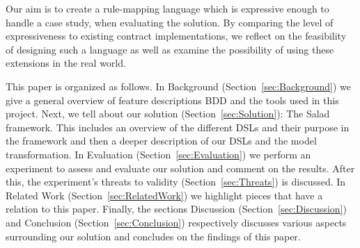 Our aim is to create a rule-mapping language which is expressive enough to handle a case study, when evaluating the solution.
By comparing the level of expressiveness to existing contract implementations, 
we reflect on the feasibility of designing such a language as well as examine the possibility of using these extensions in the real world.

This paper is organized as follows.
In Background (Section~\ref{sec:Background}) we give a general overview of feature descriptions BDD and the tools used in this project. 
Next, we tell about our solution (Section~\ref{sec:Solution}): The Salad framework.
This includes an overview of the different DSLs and their purpose in the framework and then a deeper description of our DSLs and the model transformation.
In Evaluation (Section~\ref{sec:Evaluation}) we perform an experiment to assess and evaluate our solution and comment on the results.
After this, the experiment's threats to validity (Section~\ref{sec:Threats}) is discussed.
In Related Work (Section~\ref{sec:RelatedWork}) we highlight pieces that have a relation to this paper.
Finally, the sections Discussion (Section~\ref{sec:Discussion}) and Conclusion (Section~\ref{sec:Conclusion}) respectively discusses various aspects surrounding our solution and concludes on the findings of this paper.


